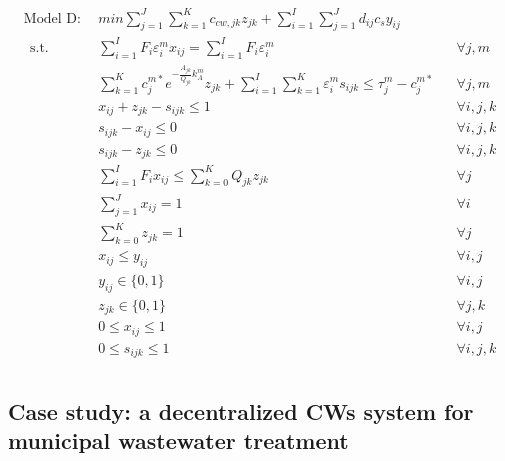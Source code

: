 \documentclass[preprint,12pt,authoryear]{elsarticle}
\begin{document}
\begin{equation*}\label{modelD}
\begin{aligned}
	\text{Model D}:~~&min \sum_{j=1}^{J}\sum_{k=1}^{K}c_{cw,jk}z_{jk}+\sum_{i=1}^{I}\sum_{j=1}^{J}d_{ij}c_sy_{ij}\\~~\mbox{s.t.}~~
	&{\sum_{i=1}^{I}F_{i}\varepsilon_{i}^{m}x_{ij}} = {\sum_{i=1}^{I}F_{i}\varepsilon_{i}^{m}}&&\forall j,m\\
	&\sum_{k=1}^{K} c_{j}^{m*} e^{-\frac{A_{jk}}{Q_{jk}}k_{A}^{m}} z_{jk} + \sum_{i=1}^{I}\sum_{k=1}^{K} \varepsilon_i^m s_{ijk} \leq \tau_j^m - c_j^{m*} && \forall j,m\\
	&x_{ij} + z_{jk} - s_{ijk} \leq 1 && \forall i, j, k\\
	&s_{ijk} - x_{ij} \leq 0 && \forall i, j, k\\
	&s_{ijk} - z_{jk} \leq 0 && \forall i, j, k\\
	&\sum_{i=1}^{I}F_{i}x_{ij}\leq\sum_{k = 0}^{K}Q_{jk}z_{jk}&&\forall j\\
	&\sum_{j=1}^{J}x_{ij} = 1&&\forall i\\
	&\sum_{k=0}^{K}z_{jk} = 1&&\forall j\\
	&x_{ij}\leq y_{ij}&&\forall i,j\\
	&y_{ij} \in \{0,1\}&&\forall i,j\\
	&z_{jk} \in \{0,1\}&&\forall j,k\\
	&0 \leq x_{ij} \leq 1&&\forall i,j\\
	&0 \leq s_{ijk} \leq 1&&\forall i,j,k\\
\end{aligned}
\end{equation*}
\newpage
\subsection{Case study: a decentralized CWs system for municipal wastewater treatment}
\end{document}
